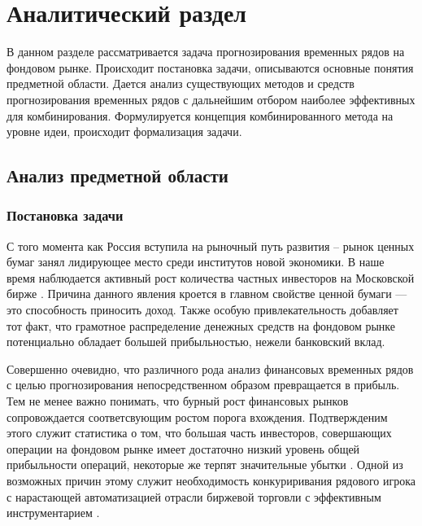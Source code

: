 \section{Аналитический раздел}

\par В данном разделе рассматривается задача прогнозирования временных рядов на фондовом рынке. Происходит постановка задачи, описываются основные понятия предметной области. Дается анализ существующих методов и средств прогнозирования временных рядов с дальнейшим отбором наиболее эффективных для комбинирования. Формулируется концепция комбинированного метода на уровне идеи, происходит формализация задачи. 


\subsection{Анализ предметной области}

\subsubsection{Постановка задачи}



 \par С того момента как Россия вступила на рыночный путь развития –
 рынок ценных бумаг занял лидирующее место среди институтов новой
 экономики. В наше время наблюдается активный рост количества частных инвесторов на Московской бирже \cite{rus-invest}. Причина данного явления кроется в главном свойстве ценной бумаги --- это способность приносить доход. Также особую привлекательность добавляет тот факт, что грамотное распределение денежных средств на фондовом рынке потенциально обладает большей прибыльностью, нежели банковский вклад.
 
 \par Совершенно очевидно, что различного рода анализ финансовых временных рядов с целью прогнозирования непосредственном образом превращается в прибыль. Тем не менее важно понимать, что бурный рост финансовых рынков сопровождается соответсвующим ростом порога вхождения. Подтвержденим этого служит статистика о том, что большая часть инвесторов, совершающих операции на фондовом рынке имеет достаточно низкий уровень общей прибыльности операций, некоторые же терпят значительные убытки \cite{tinkoff-stat}\cite{most-stat}. Одной из возможных причин этому служит необходимость конкуриривания рядового игрока с нарастающей автоматизацией отрасли биржевой торговли с эффективным инструментарием \cite{autopilot}. 
 
